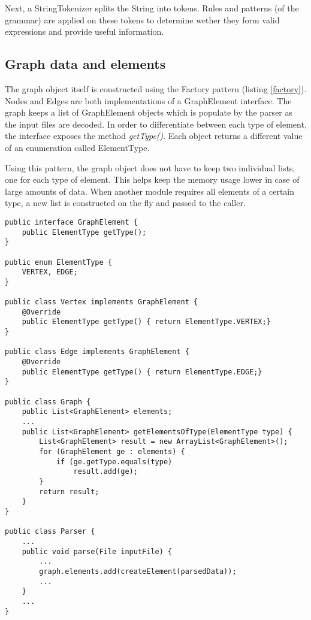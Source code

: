 Next, a StringTokenizer splits the String into tokens. Rules and patterns (of the grammar) are applied on these tokens 
to determine wether they form valid expressions and provide useful information.

\subsection{Graph data and elements}

The graph object itself is constructed using the Factory pattern (listing \ref{factory}). Nodes and Edges are both implementations of a 
GraphElement interface. The graph keeps a list of GraphElement objects which is populate by the parser as the input 
files are decoded. In order to differentiate between each type of element, the interface exposes the method 
\emph{getType()}. Each object returns a different value of an enumeration called ElementType. 

Using this pattern, the graph object does not have to keep two individual lists, one for each type of element. This 
helps keep the memory usage lower in case of large amounts of data. When another module requires all elements of a 
certain type, a new list is constructed on the fly and passed to the caller.

\begin{lstlisting}[caption=Basic class structure for factory implementation, language=Java \label{factory}]
public interface GraphElement {
	public ElementType getType();
}

public enum ElementType {
	VERTEX, EDGE;
}

public class Vertex implements GraphElement {
	@Override
	public ElementType getType() { return ElementType.VERTEX;}
}

public class Edge implements GraphElement {
	@Override
	public ElementType getType() { return ElementType.EDGE;}
}

public class Graph {
	public List<GraphElement> elements;
	...
	public List<GraphElement> getElementsOfType(ElementType type) {
		List<GraphElement> result = new ArrayList<GraphElement>();
		for (GraphElement ge : elements) {
			if (ge.getType.equals(type)
				result.add(ge);
		}
		return result;
	}
}

public class Parser {
	...
	public void parse(File inputFile) {
		...
		graph.elements.add(createElement(parsedData));
		...
	}
	...
}

\end{lstlisting}

